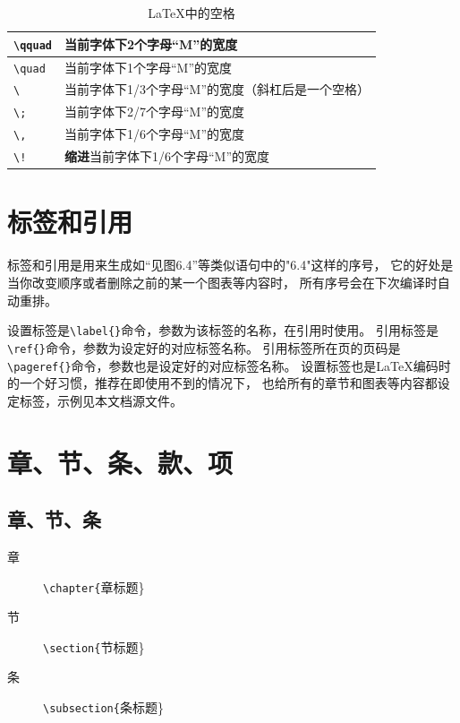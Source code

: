 \begin{table}
    \centering
    \caption{\LaTeX{}中的空格}
    \label{tab-space}
    \begin{tabular}{l|l}
        \hline
        \verb|\qquad| & 当前字体下2个字母“M”的宽度 \\ \hline
        \verb|\quad|  & 当前字体下1个字母“M”的宽度 \\ \hline
        \verb|\ |     & 当前字体下1/3个字母“M”的宽度（斜杠后是一个空格） \\ \hline
        \verb|\;|     & 当前字体下2/7个字母“M”的宽度 \\ \hline
        \verb|\,|     & 当前字体下1/6个字母“M”的宽度 \\ \hline
        \verb|\!|     & {\bf 缩进}当前字体下1/6个字母“M”的宽度 \\ \hline
    \end{tabular}
\end{table}

\section{标签和引用}
\label{sec-label-ref}

标签和引用是用来生成如“见图6.4”等类似语句中的"6.4"这样的序号，
它的好处是当你改变顺序或者删除之前的某一个图表等内容时，
所有序号会在下次编译时自动重排。

设置标签是\verb|\label{}|命令，参数为该标签的名称，在引用时使用。
引用标签是\verb|\ref{}|命令，参数为设定好的对应标签名称。
引用标签所在页的页码是\verb|\pageref{}|命令，参数也是设定好的对应标签名称。
设置标签也是\LaTeX{}编码时的一个好习惯，推荐在即使用不到的情况下，
也给所有的章节和图表等内容都设定标签，示例见本文档源文件。

\section{章、节、条、款、项}
\label{sec-title}

\subsection{章、节、条}
\label{subsec-chap-etc}

\begin{description}
    \item[章] \verb|\chapter{|章标题\}
    \item[节] \verb|\section{|节标题\}
    \item[条] \verb|\subsection{|条标题\}
\end{description}

